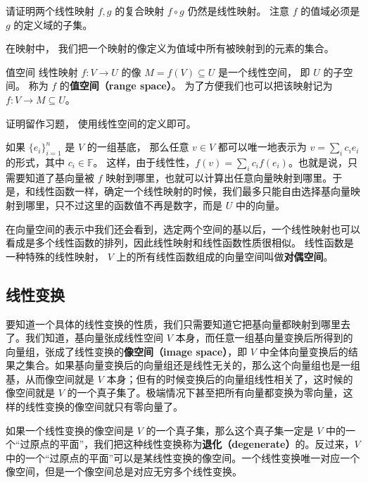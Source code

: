 \begin{exercise}{}
请证明两个线性映射 $f, g$ 的复合映射 $f \circ g$ 仍然是线性映射。 注意 $f$ 的值域必须是 $g$ 的定义域的子集。
\end{exercise}

在映射中， 我们把一个映射的像定义为值域中所有被映射到的元素的集合。
\begin{theorem}{值空间}
线性映射 $f:V\to U$ 的像 $M = f(V) \subseteq U$ 是一个线性空间， 即 $U$ 的子空间。 称为 $f$ 的\textbf{值空间（range space）}。 为了方便我们也可以把该映射记为 $f: V\to M \subseteq U$。
\end{theorem}
证明留作习题， 使用线性空间的定义即可。

如果 $\{{e}_i\}_{i=1}^n$ 是 $V$ 的一组基底， 那么任意 ${v}\in V$ 都可以唯一地表示为 ${v}=\sum_i c_i {e}_i$ 的形式，其中 $c_i\in\mathbb{F}$。 这样，由于线性性，$f({v})=\sum_ic_if({e}_i)$。也就是说，只需要知道了基向量被 $f$ 映射到哪里，也就可以计算出任意向量映射到哪里。于是，和线性函数一样，确定一个线性映射的时候，我们最多只能自由选择基向量映射到哪里，只不过这里的函数值不再是数字，而是 $U$ 中的向量。

在向量空间的表示中我们还会看到，选定两个空间的基以后，一个线性映射也可以看成是多个线性函数的排列，因此线性映射和线性函数性质很相似。 线性函数是一种特殊的线性映射， $V$ 上的所有线性函数组成的向量空间叫做\textbf{对偶空间}。

\subsection{线性变换}

要知道一个具体的线性变换的性质，我们只需要知道它把基向量都映射到哪里去了。我们知道，基向量张成线性空间 $V$ 本身，而任意一组基向量变换后所得到的向量组，张成了线性变换的\textbf{像空间（image space）}，即 $V$ 中全体向量变换后的结果之集合。如果基向量变换后的向量组还是线性无关的，那么这个向量组也是一组基，从而像空间就是 $V$ 本身；但有的时候变换后的向量组线性相关了，这时候的像空间就是 $V$ 的一个真子集了。极端情况下甚至把所有向量都变换为零向量，这样的线性变换的像空间就只有零向量了。

如果一个线性变换的像空间是 $V$ 的一个真子集，那么这个真子集一定是 $V$ 中的一个“过原点的平面”，我们把这种线性变换称为\textbf{退化（degenerate）}的。反过来，$V$ 中的一个“过原点的平面”可以是某线性变换的像空间。一个线性变换唯一对应一个像空间，但是一个像空间总是对应无穷多个线性变换。

